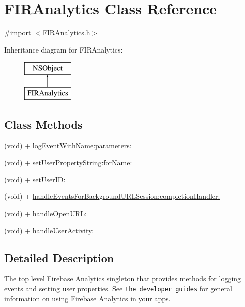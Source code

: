 \hypertarget{interface_f_i_r_analytics}{}\section{F\+I\+R\+Analytics Class Reference}
\label{interface_f_i_r_analytics}


{\ttfamily \#import $<$F\+I\+R\+Analytics.\+h$>$}

Inheritance diagram for F\+I\+R\+Analytics\+:\begin{figure}[H]
\begin{center}
\leavevmode
\includegraphics[height=2.000000cm]{interface_f_i_r_analytics}
\end{center}
\end{figure}
\subsection*{Class Methods}
\begin{DoxyCompactItemize}
\item 
(void) + \hyperlink{interface_f_i_r_analytics_a9cba5ee095acbd3757e9d87438e97fa3}{log\+Event\+With\+Name\+:parameters\+:}
\item 
(void) + \hyperlink{interface_f_i_r_analytics_ad3e57ba172e2a9df45c91698d83c001f}{set\+User\+Property\+String\+:for\+Name\+:}
\item 
(void) + \hyperlink{interface_f_i_r_analytics_a9e70957b5c5f24a25e534e5def1ef432}{set\+User\+I\+D\+:}
\item 
(void) + \hyperlink{interface_f_i_r_analytics_a4d94b911e4b619ea2540942ed3b5c595}{handle\+Events\+For\+Background\+U\+R\+L\+Session\+:completion\+Handler\+:}
\item 
(void) + \hyperlink{interface_f_i_r_analytics_a2c64690b7c4aa50fc5ac5ae81c2de9bc}{handle\+Open\+U\+R\+L\+:}
\item 
(void) + \hyperlink{interface_f_i_r_analytics_a95b43780df1ead5681f612f3a93b5197}{handle\+User\+Activity\+:}
\end{DoxyCompactItemize}


\subsection{Detailed Description}
The top level Firebase Analytics singleton that provides methods for logging events and setting user properties. See \href{http://goo.gl/gz8SLz}{\tt the developer guides} for general information on using Firebase Analytics in your apps. 

